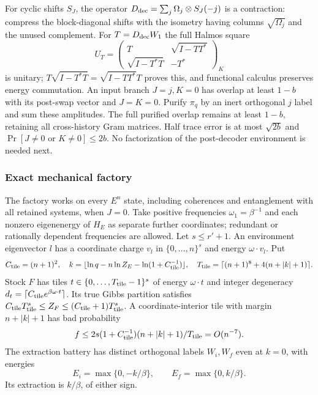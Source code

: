 \documentclass[11pt]{article}
\theoremstyle{definition}
\theoremstyle{remark}
\begin{document}
For cyclic shifts $S_J$, the operator
$D_{\rm dec}=\sum_j\Omega_j\otimes S_J(-j)$ is a contraction:
compress the block-diagonal shifts with the isometry having columns
$\sqrt{\Omega_j}$ and the unused complement.
For $T=D_{\rm dec}W_1$ the full Halmos square
\[
 U_T=\begin{pmatrix}T&\sqrt{I-TT^*}\\
                 \sqrt{I-T^*T}&-T^*\end{pmatrix}_K
\]
is unitary; $T\sqrt{I-T^*T}=\sqrt{I-TT^*}T$ proves this, and
functional calculus preserves energy commutation.
An input branch $J=j,K=0$ has overlap at least $1-b$ with its
post-swap vector and $J=K=0$. Purify $\pi_q$ by an inert orthogonal
$j$ label and sum these amplitudes. The full purified overlap remains
at least $1-b$, retaining all cross-history Gram matrices.
Half trace error is at most $\sqrt{2b}$ and
$\Pr[J\ne0\text{ or }K\ne0]\le2b$.
No factorization of the post-decoder environment is needed next.

\subsubsection{Exact mechanical factory}\label{bp-factory}
The factory works on every $E^n$ state, including coherences and
entanglement with all retained systems, when $J=0$.
Take positive frequencies $\omega_1=\beta^{-1}$ and each nonzero
eigenenergy of $H_E$ as separate further coordinates; redundant or
rationally dependent frequencies are allowed. Let $s\le r'+1$.
An environment eigenvector $l$ has a coordinate charge $v_l$ in
$\{0,\ldots,n\}^s$ and energy $\omega\cdot v_l$. Put
\[
 C_{\rm tile}=(n+1)^2,\quad
 k=\lfloor\ln q-n\ln Z_E-\ln(1+C_{\rm tile}^{-1})\rfloor,\quad
 T_{\rm tile}=\lceil(n+1)^8+4(n+|k|+1)\rceil.
\]
Stock $F$ has tiles $t\in\{0,\ldots,T_{\rm tile}-1\}^s$ of energy
$\omega\cdot t$ and integer degeneracy
$d_t=\lceil C_{\rm tile}e^{\beta\omega\cdot t}\rceil$.
Its true Gibbs partition satisfies
$C_{\rm tile}T_{\rm tile}^s\le Z_F\le(C_{\rm tile}+1)T_{\rm tile}^s$.
A coordinate-interior tile with margin $n+|k|+1$ has bad probability
\[
 f\le2s(1+C_{\rm tile}^{-1})(n+|k|+1)/T_{\rm tile}=O(n^{-7}).
\]
The extraction battery has distinct orthogonal labels $W_i,W_f$
even at $k=0$, with energies
\[
 E_i=\max\{0,-k/\beta\},\qquad E_f=\max\{0,k/\beta\}.
\]
Its extraction is $k/\beta$, of either sign.
\end{document}
